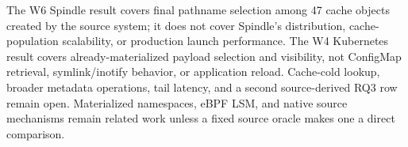 The W6 Spindle result covers final pathname selection among 47 cache objects
created by the source system; it does not cover Spindle's distribution,
cache-population scalability, or production launch performance. The W4
Kubernetes result covers already-materialized payload selection and visibility,
not ConfigMap retrieval, symlink/inotify behavior, or application reload.
Cache-cold lookup, broader metadata operations, tail latency, and a second
source-derived RQ3 row remain open. Materialized namespaces, eBPF LSM, and
native source mechanisms remain related work unless a fixed source oracle makes
one a direct comparison.
